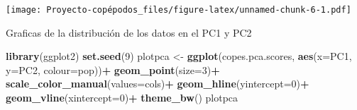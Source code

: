 \documentclass[]{article}
\newenvironment{Shaded}{\begin{snugshade}}{\end{snugshade}}
\newcommand{\DataTypeTok}[1]{\textcolor[rgb]{0.13,0.29,0.53}{#1}}
\newcommand{\DecValTok}[1]{\textcolor[rgb]{0.00,0.00,0.81}{#1}}
\newcommand{\KeywordTok}[1]{\textcolor[rgb]{0.13,0.29,0.53}{\textbf{#1}}}
\newcommand{\NormalTok}[1]{#1}
\newcommand{\OperatorTok}[1]{\textcolor[rgb]{0.81,0.36,0.00}{\textbf{#1}}}
\newcommand{\StringTok}[1]{\textcolor[rgb]{0.31,0.60,0.02}{#1}}
\begin{document}
\begin{Shaded}
\end{Shaded}

\texttt{[image: Proyecto-copépodos\_files/figure-latex/unnamed-chunk-6-1.pdf]}

\begin{Shaded}
\end{Shaded}

Graficas de la distribución de los datos en el PC1 y PC2

\begin{Shaded}
\begin{Highlighting}[]
\KeywordTok{library}\NormalTok{(ggplot2)}
\KeywordTok{set.seed}\NormalTok{(}\DecValTok{9}\NormalTok{)}
\NormalTok{plotpca <-}\StringTok{ }\KeywordTok{ggplot}\NormalTok{(copes.pca.scores, }\KeywordTok{aes}\NormalTok{(}\DataTypeTok{x=}\NormalTok{PC1, }\DataTypeTok{y=}\NormalTok{PC2, }\DataTypeTok{colour=}\NormalTok{pop))}\OperatorTok{+}
\StringTok{  }\KeywordTok{geom_point}\NormalTok{(}\DataTypeTok{size=}\DecValTok{3}\NormalTok{)}\OperatorTok{+}\StringTok{ }
\StringTok{  }\KeywordTok{scale_color_manual}\NormalTok{(}\DataTypeTok{values=}\NormalTok{cols)}\OperatorTok{+}
\StringTok{  }\KeywordTok{geom_hline}\NormalTok{(}\DataTypeTok{yintercept=}\DecValTok{0}\NormalTok{)}\OperatorTok{+}
\StringTok{  }\KeywordTok{geom_vline}\NormalTok{(}\DataTypeTok{xintercept=}\DecValTok{0}\NormalTok{)}\OperatorTok{+}
\StringTok{  }\KeywordTok{theme_bw}\NormalTok{()}
\NormalTok{plotpca}
\end{Highlighting}
\end{Shaded}
\end{document}
